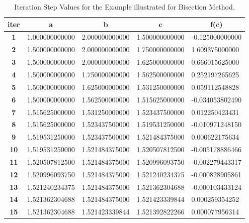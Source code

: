 \documentclass[a4paper, 12pt]{report}
\begin{document}
    \begin{table}[]
\begin{tabular}{|c|l|l|l|l|}
\hline
\textbf{iter} & \multicolumn{1}{c|}{\textbf{a}} & \multicolumn{1}{c|}{\textbf{b}} & \multicolumn{1}{c|}{\textbf{c}} & \multicolumn{1}{c|}{\textbf{f(c)}} \\ \hline
\textbf{1}  & 1.000000000000 & 2.000000000000 & 1.500000000000 & -0.125000000000 \\ \hline
\textbf{2}  & 1.500000000000 & 2.000000000000 & 1.750000000000 & 1.609375000000  \\ \hline
\textbf{3}  & 1.500000000000 & 2.000000000000 & 1.625000000000 & 0.666015625000  \\ \hline
\textbf{4}  & 1.500000000000 & 1.750000000000 & 1.562500000000 & 0.252197265625  \\ \hline
\textbf{5}  & 1.500000000000 & 1.625000000000 & 1.531250000000 & 0.059112548828  \\ \hline
\textbf{6}  & 1.500000000000 & 1.562500000000 & 1.515625000000 & -0.034053802490 \\ \hline
\textbf{7}  & 1.515625000000 & 1.531250000000 & 1.523437500000 & 0.012250423431  \\ \hline
\textbf{8}  & 1.515625000000 & 1.523437500000 & 1.519531250000 & -0.010971248150 \\ \hline
\textbf{9}  & 1.519531250000 & 1.523437500000 & 1.521484375000 & 0.000622175634  \\ \hline
\textbf{10} & 1.519531250000 & 1.521484375000 & 1.520507812500 & -0.005178886466 \\ \hline
\textbf{11} & 1.520507812500 & 1.521484375000 & 1.520996093750 & -0.002279443317 \\ \hline
\textbf{12} & 1.520996093750 & 1.521484375000 & 1.521240234375 & -0.000828905861 \\ \hline
\textbf{13} & 1.521240234375 & 1.521484375000 & 1.521362304688 & -0.000103433124 \\ \hline
\textbf{14} & 1.521362304688 & 1.521484375000 & 1.521423339844 & 0.000259354252  \\ \hline
\textbf{15} & 1.521362304688 & 1.521423339844 & 1.521392822266 & 0.000077956314  \\ \hline
\end{tabular}
\caption{Iteration Step Values for the Example illustrated for Bisection Method.}
\label{table:ISV}
\end{table}
\end{document}

